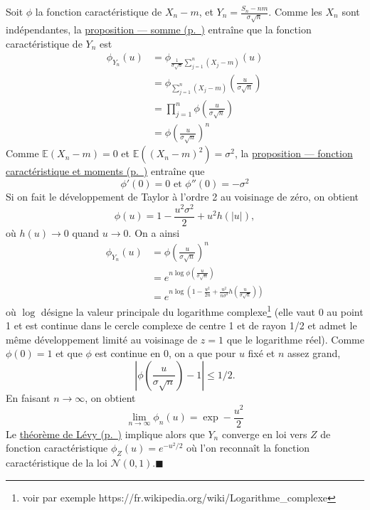 \begin{preuve}
Soit \(\phi\) la fonction caractéristique de \(X_n - m\), et
\(Y_n = \frac{S_n -nm}{\sigma \sqrt{n}}\). Comme les \(X_n\) sont
indépendantes, la \protect\hyperref[IV-fct_carac_sum]{proposition ---
somme (p.~\pageref*{IV-fct_carac_sum})} entraîne que la fonction
caractéristique de \(Y_n\) est \begin{align*}
    \phi_{Y_n}(u) & = \phi_{\frac{1}{\sigma\sqrt{n}}\sum_{j=1}^n(X_j-m)}(u) \\
                  & = \phi_{\sum_{j=1}^n(X_j-m)}\left(\frac{u}{\sigma\sqrt{n}}\right) \\
                  & = \prod_{j=1}^n \phi \left(\frac{u}{\sigma\sqrt{n}}\right)\\
                  & = \phi\left(\frac{u}{\sigma\sqrt{n}}\right)^n
\end{align*} Comme \(\mathbb{E}(X_n -m) = 0\) et
\(\mathbb{E}((X_n-m)^2) = \sigma^2\), la
\protect\hyperref[IV-fct_carac_deriv]{proposition --- fonction
caractéristique et moments (p.~\pageref*{IV-fct_carac_deriv})} entraîne
que \[\phi'(0) = 0 \text{     et } \phi''(0) = -\sigma^2\] Si on fait le
développement de Taylor à l'ordre 2 au voisinage de zéro, on obtient
\[\phi(u) = 1 - \frac{u^2\sigma^2}{2} + u^2 h(|u|),\] où \(h(u) \to 0\)
quand \(u \to 0\). On a ainsi \begin{align*}
    \phi_{Y_n}(u) & = \phi\left(\frac{u}{\sigma\sqrt{n}}\right)^n \\
                  & = e^{n\log \phi\left(\frac{u}{\sigma\sqrt{n}}\right)} \\
                  & = e^{n\log (1 - \frac{u^2}{2n} + \frac{u^2}{n\sigma^2} h(\frac{u}{\sigma\sqrt{n}}))}
\end{align*} où \(\log\) désigne la valeur principale du logarithme
complexe\footnote{voir par exemple
  https://fr.wikipedia.org/wiki/Logarithme\_complexe} (elle vaut 0 au
point 1 et est continue dans le cercle complexe de centre 1 et de rayon
1/2 et admet le même développement limité au voisinage de \(z=1\) que le
logarithme réel). Comme \(\phi(0) = 1\) et que \(\phi\) est continue en
0, on a que pour \(u\) fixé et \(n\) assez grand,
\[\left| \phi\left(\frac{u}{\sigma\sqrt{n}}\right)-1\right| \leq 1/2.\]
En faisant \(n \to \infty\), on obtient
\[\lim_{n \to \infty} \phi_n(u) = \exp -\frac{u^2}{2}\] Le
\protect\hyperref[IV-levytheorem]{théorème de
Lévy (p.~\pageref*{IV-levytheorem})} implique alors que \(Y_n\) converge
en loi vers \(Z\) de fonction caractéristique \(\phi_Z(u) = e^{-u^2/2}\)
où l'on reconnaît la fonction caractéristique de la loi
\(\mathcal{N}(0,1)\).\hfill$\blacksquare$
\end{preuve}

